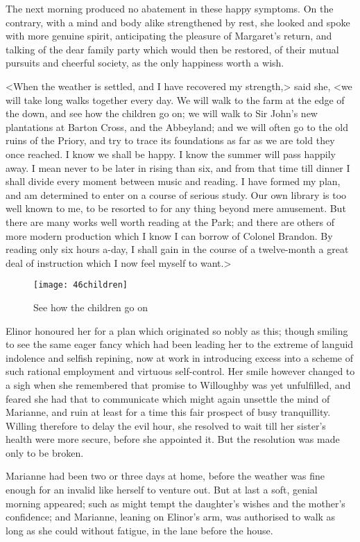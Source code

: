 The next morning produced no abatement in these happy symptoms. On the contrary, with a mind and body alike strengthened by rest, she looked and spoke with more genuine spirit, anticipating the pleasure of Margaret's return, and talking of the dear family party which would then be restored, of their mutual pursuits and cheerful society, as the only happiness worth a wish.

<When the weather is settled, and I have recovered my strength,> said she, <we will take long walks together every day. We will walk to the farm at the edge of the down, and see how the children go on; we will walk to Sir John's new plantations at Barton Cross, and the Abbeyland; and we will often go to the old ruins of the Priory, and try to trace its foundations as far as we are told they once reached. I know we shall be happy. I know the summer will pass happily away. I mean never to be later in rising than six, and from that time till dinner I shall divide every moment between music and reading. I have formed my plan, and am determined to enter on a course of serious study. Our own library is too well known to me, to be resorted to for any thing beyond mere amusement. But there are many works well worth reading at the Park; and there are others of more modern production which I know I can borrow of Colonel Brandon. By reading only six hours a-day, I shall gain in the course of a twelve-month a great deal of instruction which I now feel myself to want.>

\begin{figure}[tbph]
\centering
\texttt{[image: 46children]}
\caption{See how the children go on}
\end{figure}

Elinor honoured her for a plan which originated so nobly as this; though smiling to see the same eager fancy which had been leading her to the extreme of languid indolence and selfish repining, now at work in introducing excess into a scheme of such rational employment and virtuous self-control. Her smile however changed to a sigh when she remembered that promise to Willoughby was yet unfulfilled, and feared she had that to communicate which might again unsettle the mind of Marianne, and ruin at least for a time this fair prospect of busy tranquillity. Willing therefore to delay the evil hour, she resolved to wait till her sister's health were more secure, before she appointed it. But the resolution was made only to be broken.

Marianne had been two or three days at home, before the weather was fine enough for an invalid like herself to venture out. But at last a soft, genial morning appeared; such as might tempt the daughter's wishes and the mother's confidence; and Marianne, leaning on Elinor's arm, was authorised to walk as long as she could without fatigue, in the lane before the house.

